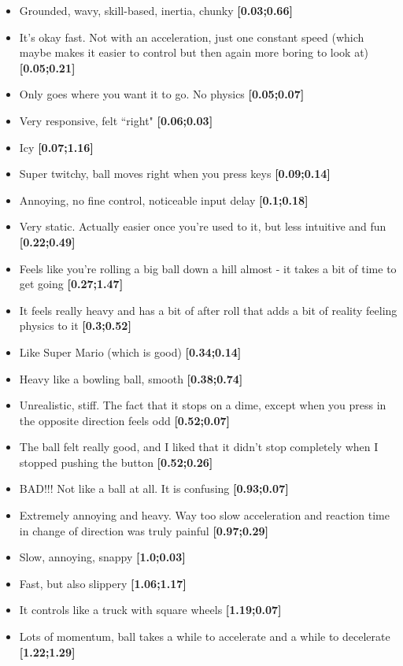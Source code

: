 \begin{itemize}[noitemsep,nolistsep]
\item Grounded, wavy, skill-based, inertia, chunky \textbf{[0.03;0.66]}
\item It's okay fast. Not with an acceleration, just one constant speed (which maybe makes it easier to control but then again more boring to look at) \textbf{[0.05;0.21]}
\item Only goes where you want it to go. No physics \textbf{[0.05;0.07]}
\item Very responsive, felt ``right" \textbf{[0.06;0.03]}
\item Icy \textbf{[0.07;1.16]}
\item Super twitchy, ball moves right when you press keys \textbf{[0.09;0.14]}
\item Annoying, no fine control, noticeable input delay \textbf{[0.1;0.18]}
\item Very static. Actually easier once you're used to it, but less intuitive and fun \textbf{[0.22;0.49]}
\item Feels like you're rolling a big ball down a hill almost - it takes a bit of time to get going \textbf{[0.27;1.47]}
\item It feels really heavy and has a bit of after roll that adds a bit of reality feeling physics to it \textbf{[0.3;0.52]}
\item Like Super Mario (which is good) \textbf{[0.34;0.14]}
\item Heavy like a bowling ball, smooth \textbf{[0.38;0.74]}
\item Unrealistic, stiff. The fact that it stops on a dime, except when you press in the opposite direction feels odd \textbf{[0.52;0.07]}
\item The ball felt really good, and I liked that it didn't stop completely when I stopped pushing the button \textbf{[0.52;0.26]}
\item BAD!!! Not like a ball at all. It is confusing \textbf{[0.93;0.07]}
\item Extremely annoying and heavy. Way too slow acceleration and reaction time in change of direction was truly painful \textbf{[0.97;0.29]}
\item Slow, annoying, snappy \textbf{[1.0;0.03]}
\item Fast, but also slippery \textbf{[1.06;1.17]}
\item It controls like a truck with square wheels \textbf{[1.19;0.07]}
\item Lots of momentum, ball takes a while to accelerate and a while to decelerate \textbf{[1.22;1.29]}

\end{itemize}
